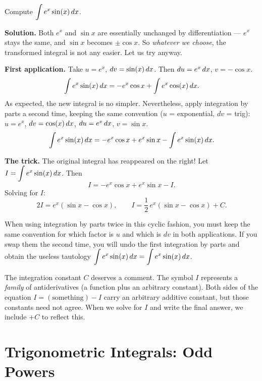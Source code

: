 \begin{example}
\label{ex:9-12}
Compute $\displaystyle\int e^{x}\sin(x)\,dx$.

\textbf{Solution.}  Both $e^{x}$ and $\sin x$ are essentially unchanged by differentiation --- $e^{x}$ stays the same, and $\sin x$ becomes $\pm\cos x$.  So \textit{whatever we choose}, the transformed integral is not any easier.  Let us try anyway.

\textbf{First application.}  Take $u = e^{x}$, $dv = \sin(x)\,dx$.  Then $du = e^{x}\,dx$, $v = -\cos x$.
\[
  \int e^{x}\sin(x)\,dx = -e^{x}\cos x + \int e^{x}\cos(x)\,dx.
\]
As expected, the new integral is no simpler.  Nevertheless, apply integration by parts a second time, keeping the same convention ($u$ = exponential, $dv$ = trig):  $u = e^{x}$, $dv = \cos(x)\,dx$, $du = e^{x}\,dx$, $v = \sin x$.
\[
  \int e^{x}\sin(x)\,dx = -e^{x}\cos x + e^{x}\sin x - \int e^{x}\sin(x)\,dx.
\]

\textbf{The trick.}  The original integral has reappeared on the right!  Let $I = \displaystyle\int e^{x}\sin(x)\,dx$.  Then
\[
  I = -e^{x}\cos x + e^{x}\sin x - I.
\]
Solving for $I$:
\[
  2I = e^{x}(\sin x - \cos x), \qquad I = \frac{1}{2}\,e^{x}(\sin x - \cos x) + C.
\]
\end{example}

\begin{remark}[Warning]
When using integration by parts twice in this cyclic fashion, you must keep the same convention for which factor is $u$ and which is $dv$ in both applications.  If you swap them the second time, you will undo the first integration by parts and obtain the useless tautology $\displaystyle\int e^{x}\sin(x)\,dx = \int e^{x}\sin(x)\,dx$.
\end{remark}

\begin{remark}
The integration constant $C$ deserves a comment.  The symbol $I$ represents a \textit{family} of antiderivatives (a function plus an arbitrary constant).  Both sides of the equation $I = (\text{something}) - I$ carry an arbitrary additive constant, but those constants need not agree.  When we solve for $I$ and write the final answer, we include $+C$ to reflect this.
\end{remark}

\section{Trigonometric Integrals: Odd Powers}
\label{sec:9.7}

